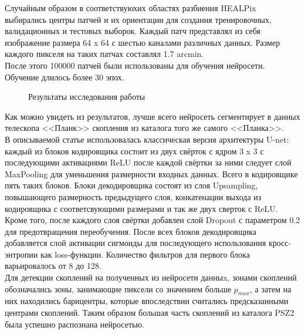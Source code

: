 Случайным образом в соответствуюхих областях разбиения HEALPix выбирались центры патчей и их 
ориентации для создания тренировочных, валидационных и тестовых выборок. Каждый патч представлял 
из себя изображение размера 64 x 64 с шестью каналами различных данных. Размер каждого пикселя 
на таких патчах составлял 1.7 arcmin. \\

После этого 100000 патчей были использованы для обучения нейросети. Обучение длилось более 30 эпох. \\ 
\begin{figure}[h!]
	\center{\texttt{[image: sz0]}}
	\caption{Результаты исследования работы \cite{Bonjean}}
\end{figure}

Как можно увидеть из результатов, лучше всего нейросеть сегментирует в данных телескопа <<Планк>> 
скопления из каталога того же самого <<Планка>>.\\

В описываемой статье использовалась классическая версия архитектуры U-net: каждый из блоков 
кодировщика состоит из двух свёрток с ядром 3 x 3 с последующими активациями ReLU после каждой 
свёртки за ними следует слой MaxPooling для уменьшения размерности входных данных. Всего в 
кодировщике пять таких блоков. Блоки декодировщика состоят из слоя Upsampling, повышающего 
размерность предыдущего слоя, конкатенации выхода из кодировщика с соответсвующими размерами и 
так же двух сверток с ReLU. Кроме того, после каждого слоя свёртки добавлен слой Dropout с 
параметром 0.2 для предотвращения переобучения. После всех блоков декодировщика добавляется слой 
активации сигмоиды для последующего использования кросс-энтропии как loss-функции. Количество 
фильтров для первого блока варьировалось от 8 до 128.\\

Для детекции скоплений на полученных из нейросети данныx, зонами скоплений обозначались зоны, 
занимающие пиксели со значением больше $p_{max}$, а затем на них находились барицентры, которые 
впоследствии считались предсказанными центрами скоплений. Таким образом большая часть скоплений из 
каталога PSZ2 была успешно распознана нейросетью. \\
